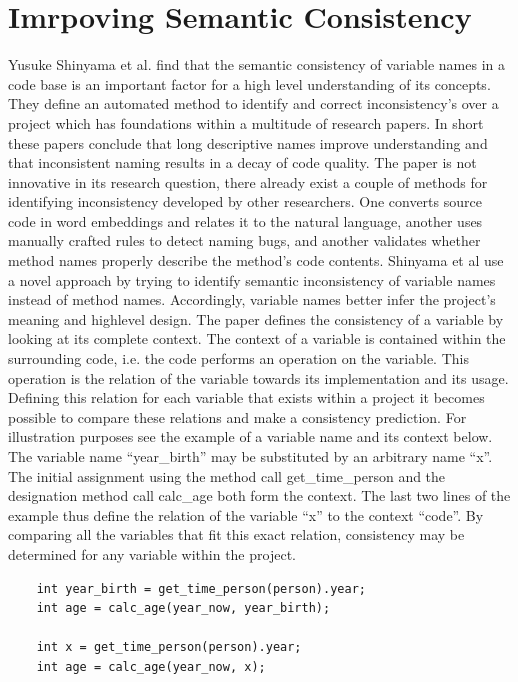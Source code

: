 \documentclass[a4paper,12pt]{article}
\begin{document}
\section{Imrpoving Semantic Consistency}
Yusuke Shinyama et al. find that the semantic consistency of variable names in a code base is an important factor for a high level understanding of its concepts. They define an automated method to identify and correct inconsistency’s over a project which has foundations within a multitude of research papers. In short these papers conclude that long descriptive names improve understanding and that inconsistent naming results in a decay of code quality.
The paper is not innovative in its research question, there already exist a couple of methods for identifying inconsistency developed by other researchers. One converts source code in word embeddings and relates it to the natural language, another uses manually crafted rules to detect naming bugs, and another validates whether method names properly describe the method’s code contents. Shinyama et al use a novel approach by trying to identify semantic inconsistency of variable names instead of method names. Accordingly, variable names better infer the project’s meaning and highlevel design.
The paper defines the consistency of a variable by looking at its complete context. The context of a variable is contained within the surrounding code, i.e. the code performs an operation on the variable. This operation is the relation of the variable towards its implementation and its usage. Defining this relation for each variable that exists within a project it becomes possible to compare these relations and make a consistency prediction.
For illustration purposes see the example of a variable name and its context below. The variable name “year\_birth” may be substituted by an arbitrary name “x”. The initial assignment using the method call get\_time\_person and the designation method call calc\_age both form the context. The last two lines of the example thus define the relation of the variable “x” to the context “code”. By comparing all the variables that fit this exact relation, consistency may be determined for any variable within the project.

\begin{verbatim}
    int year_birth = get_time_person(person).year;
    int age = calc_age(year_now, year_birth);

    int x = get_time_person(person).year;
    int age = calc_age(year_now, x);
\end{verbatim}
\end{document}
